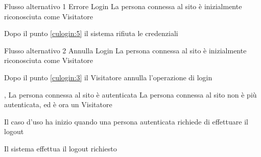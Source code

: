 %
{Flusso alternativo 1}%
{Errore Login}%
{La persona connessa al sito è inizialmente riconosciuta come Visitatore}%
{\postNulle}%
{\begin{enumCU}
	\item Dopo il punto \ref{culogin:5} il sistema rifiuta le credenziali
\end{enumCU}}%
%
{Flusso alternativo 2}%
{Annulla Login}%
{La persona connessa al sito è inizialmente riconosciuta come Visitatore}%
{\postNulle}%
{\begin{enumCU}
		\item Dopo il punto \ref{culogin:3} il Visitatore annulla l'operazione di login
	\end{enumCU}}%

\tabcuvspace

{, }
{La persona connessa al sito è autenticata}
{La persona connessa al sito non è più autenticata, ed è ora un Visitatore}
{\begin{enumCU}
	\item Il caso d'uso ha inizio quando una persona autenticata richiede di effettuare il logout
	\item Il sistema effettua il logout richiesto
\end{enumCU}}

